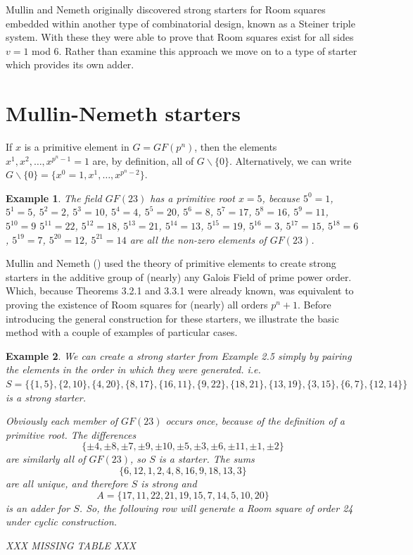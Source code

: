 \documentclass[
  11pt,
  a4paper]{book}
\newtheorem{example}{Example}
\begin{document}
Mullin and Nemeth originally discovered strong starters for
Room squares embedded within another type of combinatorial
design, known as a Steiner triple system. With these they
were able to prove that Room squares exist for all sides
\(v=1\) mod 6. Rather than examine this approach we move on to
a type of starter which provides its own adder.

\hypertarget{mullin-nemeth-starters}{%
\section{Mullin-Nemeth starters}\label{mullin-nemeth-starters}}

If \(x\) is a primitive element in \(G = GF(p^n)\), then the elements
\(x^1, x^2, \ldots, x^{p^n - 1} = 1\) are, by definition, all of
\(G \backslash \{0\}\). Alternatively, we can write
\(G \backslash \{0\} = \{x^0 = 1, x^1, \ldots, x^{p^n - 2}\}\).

\begin{example}
The field $GF(23)$ has a primitive root $x = 5$, because
$5^0 = 1$, $5^1 = 5$, $5^2 = 2$, $5^3 = 10$, $5^4 = 4$,
$5^5 = 20$, $5^6 = 8$, $5^7 = 17$, $5^8 = 16$, $5^9 = 11$,
$5^{10} = 9$ $5^{11} = 22$, $5^{12} = 18$, $5^{13} = 21$,
$5^{14}  =13$, $5^{15} = 19$, $5^{16} = 3$, $5^{17} = 15$,
$5^{18} = 6$, $5^{19} = 7$, $5^{20} = 12$, $5^{21} = 14$
are all the non-zero elements of $GF(23)$.
\end{example}

Mullin and Nemeth (\textcite{mullin_furnishing_1969}) used the theory
of primitive elements to create strong starters in the
additive group of (nearly) any Galois Field of prime power
order. Which, because Theorems 3.2.1 and 3.3.1 were already
known, was equivalent to proving the existence of Room
squares for (nearly) all orders \(p^n + 1\). Before
introducing the general construction for these starters, we
illustrate the basic method with a couple of examples of
particular cases.

\begin{example}
We can create a strong starter from Example 2.5 simply by
pairing the elements in the order in which they were
generated.
i.e.
$S = \{\{1, 5\}, \{2, 10\}, \{4, 20\}, \{8, 17\}, \{16, 11\}, \{9, 22\}, \{18, 21\}, \{13, 19\}, \{3, 15\}, \{6, 7\}, \{12, 14\}\}$
is a strong starter.

Obviously each member of $GF(23)$ occurs once, because of
the definition of a primitive root.  The differences
$$\{\pm 4, \pm 8, \pm 7, \pm 9, \pm 10, \pm 5, \pm 3, \pm 6, \pm 11, \pm 1, \pm 2\}$$
are similarly all of $GF(23)$, so $S$ is a
starter. The sums
$$\{6, 12, 1, 2, 4, 8, 16, 9, 18, 13, 3\}$$
are all
unique, and therefore $S$ is strong and
$$A = \{17, 11, 22, 21, 19, 15, 7, 14, 5, 10, 20\}$$
is an adder for $S$. So, the following row will generate a
Room square of order 24 under cyclic construction.

XXX MISSING TABLE XXX

\end{example}
\end{document}
